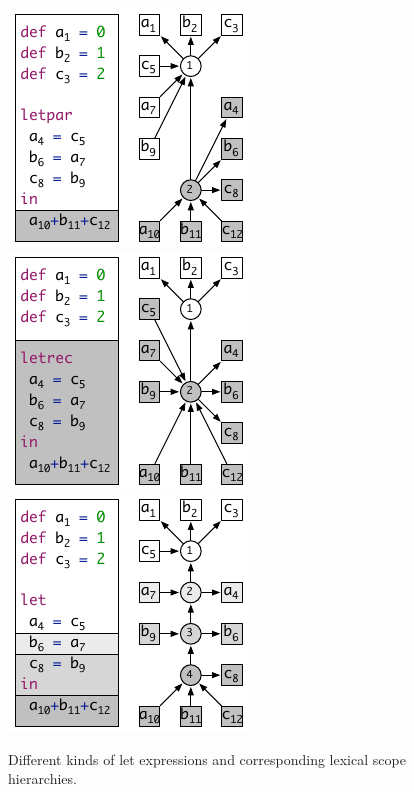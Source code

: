 \begin{figure}[htb]
\begin{center}
  \includegraphics[trim=0.7cm 0cm 0cm 0cm]{figures/scope-graphs/lets/par}
  \includegraphics[trim=0.7cm 0cm 0cm 0cm]{figures/scope-graphs/lets/rec}
  \includegraphics{figures/scope-graphs/lets/seq}
  \caption{Different kinds of let expressions and corresponding lexical scope hierarchies.}
\end{center}
\end{figure}

